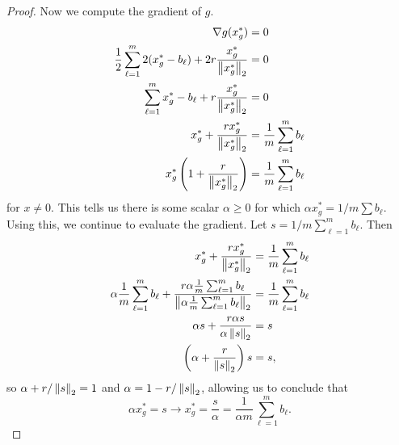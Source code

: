 \documentclass{exam}
\begin{document}
\begin{questions}
\begin{parts}
\begin{proof}
            Now we compute the gradient of $g$.
            \begin{align*}
                \nabla g(x_g^*) &= 0 \\
                \frac{1}{2}\sum_{\ell = 1}^m 2(x_g^* - b_\ell) + 2r\frac{x_g^*}{\left\| x_g^* \right\|_2} &= 0 \\
                \sum_{\ell = 1}^m x_g^* - b_\ell + r\frac{x_g^*}{\left\| x_g^* \right\|_2} &= 0 \\
                x_g^* + \frac{rx_g^*}{\left\| x_g^* \right\|_2} &= \frac{1}{m}\sum_{\ell = 1}^m b_\ell \\
                x_g^*\left( 1 + \frac{r}{\left\| x_g^* \right\|_2} \right) &= \frac{1}{m}\sum_{\ell = 1}^m b_\ell
            \end{align*}
            for $x \neq 0$. This tells us there is some scalar $\alpha \geq 0$ for which $\alpha x_g^* = 1/m \sum b_\ell$. Using this, we continue to evaluate the gradient. Let $s = 1/m \sum_{\ell = 1}^m b_\ell$. Then
            \begin{align*}
                x_g^* + \frac{rx_g^*}{\left\| x_g^* \right\|_2} &= \frac{1}{m}\sum_{\ell = 1}^m b_\ell \\
                \alpha \frac{1}{m}\sum_{\ell = 1}^m b_\ell + \frac{r\alpha\frac{1}{m}\sum_{\ell = 1}^mb_\ell}{\left\| \alpha \frac{1}{m}\sum_{\ell = 1}^mb_\ell \right\|_2} &= \frac{1}{m}\sum_{\ell = 1}^mb_\ell \\
                \alpha s + \frac{r\alpha s}{\alpha \left\| s \right\|_2} &= s \\
                \left( \alpha + \frac{r}{\left\| s \right\|_2} \right)s &= s,
            \end{align*}
            so $\alpha + r / \left\| s \right\|_2 = 1$ and $\alpha = 1 - r / \left\| s \right\|_2$, allowing us to conclude that
            $$\alpha x_g^* = s \longrightarrow x_g^* = \frac{s}{\alpha} = \frac{1}{\alpha m}\sum_{\ell = 1}^m b_\ell.$$


\end{proof}
\end{parts}
\end{questions}
\end{document}
